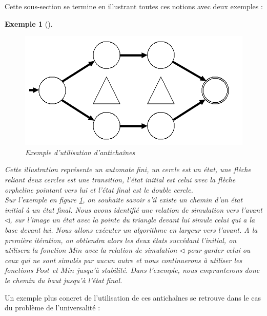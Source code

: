 \documentclass[11pt,a4paper,oneside]{book}
\theoremstyle{break}
\newtheorem{exem}{Exemple}
\theoremstyle{breakplain}
\begin{document}
Cette sous-section se termine en illustrant toutes ces notions avec deux exemples :

\begin{exem}[]
\begin{figure}[!h]
\includegraphics[width=\textwidth]{images/exanti2.png}
\caption{Exemple d'utilisation d'antichaînes}
\label{dfna}
\end{figure}

Cette illustration représente un automate fini, un cercle est un état, une flèche reliant deux cercles est une transition, l'état initial est celui avec la flèche orpheline pointant vers lui et l'état final est le double cercle.\\

Sur l'exemple en figure \ref{dfna}, on souhaite savoir s'il existe un chemin d'un état initial à un état final. Nous avons identifié une relation de simulation vers l'avant $\triangleleft$, sur l'image un état avec la pointe du triangle devant lui simule celui qui a la base devant lui. Nous allons exécuter un algorithme en largeur vers l'avant. A la première itération, on obtiendra alors les deux états succédant l'initial, on utilisera la fonction $Min$ avec la relation de simulation $\triangleleft$ pour garder celui ou ceux qui ne sont simulés par aucun autre et nous continuerons à utiliser les fonctions $Post$ et $Min$ jusqu'à stabilité. Dans l'exemple, nous emprunterons donc le chemin du haut jusqu'à l'état final.

\end{exem}

Un exemple plus concret de l'utilisation de ces antichaînes se retrouve dans le cas du problème de l'universalité :
\end{document}
